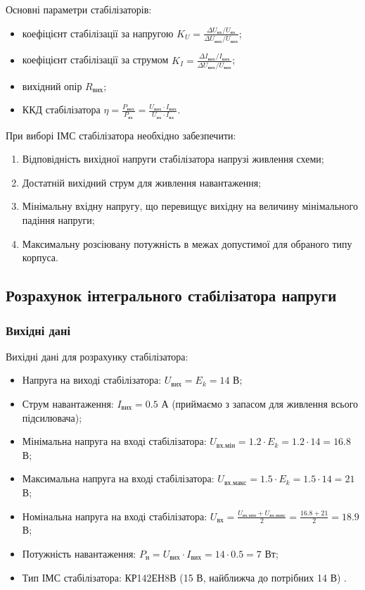 \documentclass[main.tex]{subfiles}
\begin{document}
Основні параметри стабілізаторів:
\begin{itemize}
    \item коефіцієнт стабілізації за напругою $K_U = \frac{\Delta U_{\text{вх}}/U_{\text{вх}}}{\Delta U_{\text{вих}}/U_{\text{вих}}}$;
    \item коефіцієнт стабілізації за струмом $K_I = \frac{\Delta I_{\text{вих}}/I_{\text{вих}}}{\Delta U_{\text{вих}}/U_{\text{вих}}}$;
    \item вихідний опір $R_{\text{вих}}$;
    \item ККД стабілізатора $\eta = \frac{P_{\text{вих}}}{P_{\text{вх}}} = \frac{U_{\text{вих}} \cdot I_{\text{вих}}}{U_{\text{вх}} \cdot I_{\text{вх}}}$.
\end{itemize}

При виборі ІМС стабілізатора необхідно забезпечити:
\begin{enumerate}
    \item Відповідність вихідної напруги стабілізатора напрузі живлення схеми;
    \item Достатній вихідний струм для живлення навантаження;
    \item Мінімальну вхідну напругу, що перевищує вихідну на величину мінімального падіння напруги;
    \item Максимальну розсіювану потужність в межах допустимої для обраного типу корпуса.
\end{enumerate}

\subsection{Розрахунок інтегрального стабілізатора напруги}

\subsubsection{Вихідні дані}

Вихідні дані для розрахунку стабілізатора:
\begin{itemize}
    \item Напруга на виході стабілізатора: $U_{\text{вих}} = E_k = 14$ В;
    \item Струм навантаження: $I_{\text{вих}} = 0.5$ А (приймаємо з запасом для живлення всього підсилювача);
    \item Мінімальна напруга на вході стабілізатора: $U_{\text{вх.мін}} = 1.2 \cdot E_k = 1.2 \cdot 14 = 16.8$ В;
    \item Максимальна напруга на вході стабілізатора: $U_{\text{вх.макс}} = 1.5 \cdot E_k = 1.5 \cdot 14 = 21$ В;
    \item Номінальна напруга на вході стабілізатора: $U_{\text{вх}} = \frac{U_{\text{вх.мін}} + U_{\text{вх.макс}}}{2} = \frac{16.8 + 21}{2} = 18.9$ В;
    \item Потужність навантаження: $P_{\text{н}} = U_{\text{вих}} \cdot I_{\text{вих}} = 14 \cdot 0.5 = 7$ Вт;
    \item Тип ІМС стабілізатора: КР142ЕН8В (15 В, найближча до потрібних 14 В) \cite{electronics_handbook}.
\end{itemize}
\end{document}
